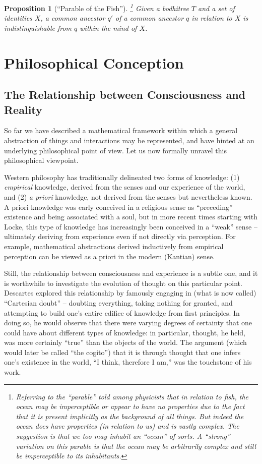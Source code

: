 \documentclass[pra,twocolumn,groupedaddress,10pt]{revtex4}
\newtheorem{proposition}[theorem]{Proposition}
\theoremstyle{definition}
\begin{document}
\begin{proposition}[``Parable of the Fish'']\footnote{Referring to the ``parable'' told among physicists that in relation to fish, the ocean may be imperceptible or appear to have no properties due to the fact that it is present implicitly as the background of all things. But indeed the ocean does have properties (in relation to us) and is vastly complex. The suggestion is that we too may inhabit an ``ocean'' of sorts. A ``strong'' variation on this parable is that the ocean may be \emph{arbitrarily} complex and still be imperceptible to its inhabitants.}
	Given a bodhitree $T$ and a set of identities $X$, a common ancestor $q'$ of a common ancestor $q$ in relation to $X$ is indistinguishable from $q$ within the mind of $X$.
\end{proposition}

\section{Philosophical Conception} \label{sec:phicon}

\subsection{The Relationship between Consciousness and Reality}

So far we have described a mathematical framework within which a general abstraction of things and interactions may be represented, and have hinted at an underlying philosophical point of view. Let us now formally unravel this philosophical viewpoint.

Western philosophy has traditionally delineated two forms of knowledge: (1) \emph{empirical} knowledge, derived from the senses and our experience of the world, and (2) \emph{a priori} knowledge, not derived from the senses but nevertheless known. A priori knowledge was early conceived in a religious sense as ``preceding'' existence and being associated with a soul, but in more recent times starting with Locke\cite{russell}, this type of knowledge has increasingly been conceived in a ``weak'' sense -- ultimately deriving from experience even if not directly via perception. For example, mathematical abstractions derived inductively from empirical perception can be viewed as a priori in the modern (Kantian\cite{kant}) sense.

Still, the relationship between consciousness and experience is a subtle one, and it is worthwhile to investigate the evolution of thought on this particular point. Descartes\cite{descartes} explored this relationship by famously engaging in (what is now called) ``Cartesian doubt'' -- doubting everything, taking nothing for granted, and attempting to build one's entire edifice of knowledge from first principles. In doing so, he would observe that there were varying degrees of certainty that one could have about different types of knowledge: in particular, thought, he held, was more certainly ``true'' than the objects of the world. The argument (which would later be called ``the cogito'') that it is through thought that one infers one's existence in the world, ``I think, therefore I am,'' was the touchstone of his work.
\end{document}
